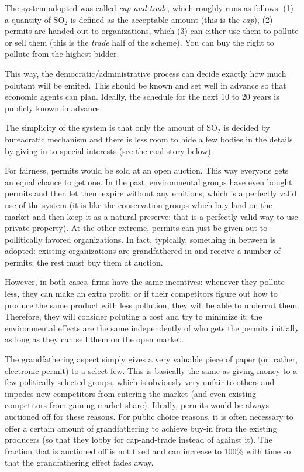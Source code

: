 The system adopted was called \emph{cap-and-trade}, which roughly runs as
follows: (1) a quantity of SO${}_2$ is defined as the acceptable amount (this
is the \emph{cap}), (2) permits are handed out to organizations, which (3) can
either use them to pollute or sell them (this is the \emph{trade} half of the
scheme). You can buy the right to pollute from the highest bidder.

This way, the democratic/administrative process can decide exactly how much
polutant will be emited. This should be known and set well in advance so that
economic agents can plan. Ideally, the schedule for the next 10 to 20 years
is publicly known in advance.

The simplicity of the system is that only the amount of SO${}_2$ is decided by
bureacratic mechanism and there is less room to hide a few bodies in the
details by giving in to special interests (see the coal story below).

For fairness, permits would be sold at an open auction. This way everyone gets
an equal chance to get one. In the past, environmental groups have even bought
permits and then let them expire without any emitions; which is a perfectly
valid use of the system (it is like the conservation groups which buy land on
the market and then keep it as a natural preserve: that is a perfectly valid
way to use private property). At the other extreme, permits can just be given
out to pollitically favored organizations. In fact, typically, something in
between is adopted: existing organizations are grandfathered in and receive a
number of permits; the rest must buy them at auction.

However, in both cases, firms have the same incentives: whenever they pollute
less, they can make an extra profit; or if their competitors figure out how to
produce the same product with less pollution, they will be able to undercut
them. Therefore, they will consider poluting a cost and try to minimize it: the
environmental effects are the same independently of who gets the permits
initially as long as they can sell them on the open market.

The grandfathering aspect simply gives a very valuable piece of paper (or,
rather, electronic permit) to a select few. This is basically the same as
giving money to a few politically selected groups, which is obviously very
unfair to others and impedes new competitors from entering the market (and even
existing competitors from gaining market share). Ideally, permits would be
always auctioned off for these reasons. For public choice reasons, it is often
necessary to offer a certain amount of grandfathering to achieve buy-in from
the existing producers (so that they lobby for cap-and-trade instead of against
it). The fraction that is auctioned off is not fixed and can increase to 100\%
with time so that the grandfathering effect fades away.

